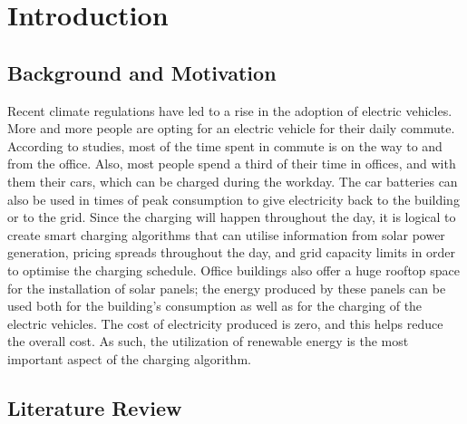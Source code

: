 \chapter{Introduction}
\label{ch:introduction}

\section{Background and Motivation}
\label{sec:background}

Recent climate regulations have led to a rise in the adoption of electric vehicles. More and more people are opting for an electric vehicle for their daily commute. According to studies, most of the time spent in commute is on the way to and from the office. Also, most people spend a third of their time in offices, and with them their cars, 
which can be charged during the workday. The car batteries can also be used in times of peak consumption to give electricity back to the building or to the grid. Since the charging will happen throughout the day,  
it is logical to create smart charging algorithms that can utilise information from solar power generation, pricing spreads throughout the day, and grid capacity limits in order to optimise the charging schedule. Office buildings also offer a huge rooftop space for the installation of solar panels; 
the energy produced by these panels can be used both for the building's consumption as well as for the charging of the electric vehicles. The cost of electricity produced is zero, and this helps reduce the overall cost. As such, the utilization of renewable energy is the most important aspect of the charging algorithm. 

\section{Literature Review}
\label{sec:literature_review}

